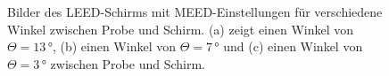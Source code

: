 \begin{figure}[H]
    \centering
    \qquad
    \qquad
    \caption{Bilder des LEED-Schirms mit MEED-Einstellungen für verschiedene Winkel zwischen Probe und Schirm. 
            (a) zeigt einen Winkel von $\Theta=13\,\si{\degree}$, (b) einen Winkel von $\Theta=7\,\si{\degree}$ und (c) einen Winkel von $\Theta=3\,\si{\degree}$ zwischen Probe und Schirm.}%
    \label{fig:MEED-Bilder}
  \end{figure}


